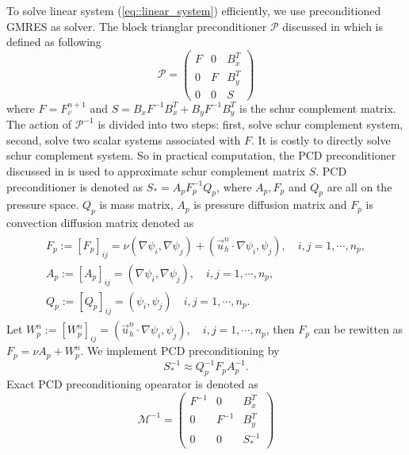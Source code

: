 \documentclass{eajam}
\begin{document}
  To solve linear system (\ref{eq::linear_system}) efficiently, we 
  use preconditioned GMRES as solver. The block trianglar
  preconditioner $\mathcal{P}$ discussed in \cite{elman2005finite}
  which is defined as following
  \begin{equation}
    \mathcal{P} = 
    \left( 
      \begin{array}{lll}
        F & 0 & B_x^T \\
        0 & F  & B_y^T \\
        0 & 0 & S
      \end{array}
    \right)
  \end{equation}
  where $F = F_v^{n + 1}$ and $S = B_xF^{-1}B_x^T + B_yF^{-1}B_y^T$ is
  the schur complement matrix. The action of $\mathcal{P}^{-1}$ is
  divided into two steps: first, solve schur complement system,
  second, solve two scalar systems associated with $F$. It is costly
  to directly solve schur complement system. So in practical
  computation, the PCD preconditioner discussed in
  \cite{elman2005finite} is used to approximate schur complement
  matrix $S$. PCD preconditioner is denoted as $S_* = A_p F_p^{-1}
  Q_p$, where $A_p, F_p$ and $Q_p$ are all on the pressure
  space. $Q_p$ is mass matrix, $A_p$ is pressure diffusion matrix and
  $F_p$ is convection diffusion matrix denoted as
  \begin{eqnarray}
    \begin{aligned}
      F_p := [F_p]_{ij} = \nu (\nabla \psi_i, \nabla \psi_j) +
      (\vec{u}_h^n \cdot \nabla \psi_i, \psi_j), \quad i,j = 1, \cdots,
      n_p, \\     
      A_p := [A_p]_{ij} = (\nabla \psi_i, \nabla \psi_j),\quad i,j = 1, \cdots,
      n_p, \\
      Q_p := [Q_p]_{ij} = (\psi_i, \psi_j) \quad i,j = 1, \cdots, n_p.
    \end{aligned}
    \label{eq::pcd_mat}
  \end{eqnarray}
  Let $W_p^n := [W_p^n]_{ij} = (\vec{u}_h^n \cdot \nabla \psi_i,
  \psi_j), \quad i,j = 1, \cdots, n_p$, then $F_p$ can be rewitten as
  $F_p = \nu A_p + W_p^n$. We implement PCD preconditioning by 
  \begin{equation}
    S_*^{-1} \approx Q_p^{-1} F_p A_p^{-1}.
  \end{equation}
  Exact PCD preconditioning opearator is denoted as 
  \begin{equation}
    \mathcal{M}^{-1} = 
    \left(
      \begin{array}{lll}
        F^{-1} & 0 & B_x^T \\
        0 & F^{-1} & B_y^T \\
        0 & 0 &S_*^{-1}
      \end{array}
    \right)
  \end{equation}
\end{document}
